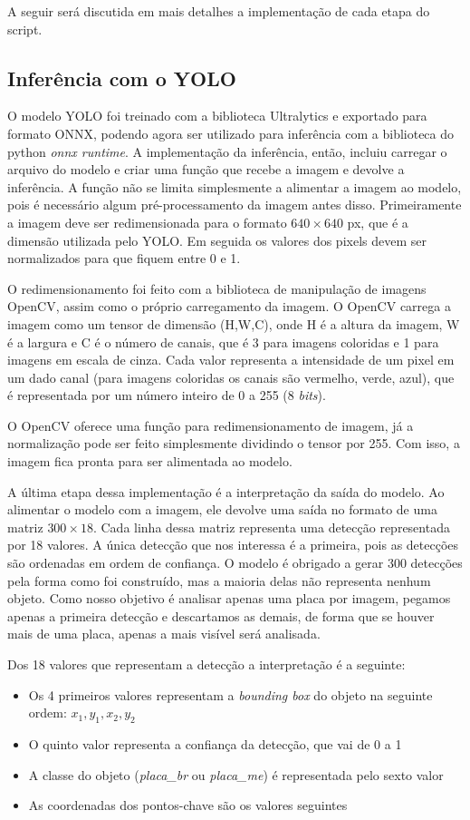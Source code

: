 A seguir será discutida em mais detalhes a implementação de cada etapa do script.

\subsection{Inferência com o YOLO}
O modelo YOLO foi treinado com a biblioteca Ultralytics e exportado para formato ONNX, podendo agora ser utilizado para inferência com a biblioteca do python \textit{onnx runtime}. A implementação da inferência, então, incluiu carregar o arquivo do modelo e criar uma função que recebe a imagem e devolve a inferência.
A função não se limita simplesmente a alimentar a imagem ao modelo, pois é necessário algum pré-processamento da imagem antes disso. Primeiramente a imagem deve ser redimensionada para o formato $640 \times 640$ px, que é a dimensão utilizada pelo YOLO. Em seguida os valores dos pixels devem ser normalizados para que fiquem entre 0 e 1.

O redimensionamento foi feito com a biblioteca de manipulação de imagens OpenCV, assim como o próprio carregamento da imagem. O OpenCV carrega a imagem como um tensor de dimensão (H,W,C), onde H é a altura da imagem, W é a largura e C é o número de canais, que é 3 para imagens coloridas e 1 para imagens em escala de cinza. Cada valor representa a intensidade de um pixel em um dado canal (para imagens coloridas os canais são vermelho, verde, azul), que é representada por um número inteiro de 0 a 255 (8 \textit{bits}).

O OpenCV oferece uma função para redimensionamento de imagem, já a normalização pode ser feito simplesmente dividindo o tensor por 255. Com isso, a imagem fica pronta para ser alimentada ao modelo.

A última etapa dessa implementação é a interpretação da saída do modelo. Ao alimentar o modelo com a imagem, ele devolve uma saída no formato de uma matriz $300 \times 18$. Cada linha dessa matriz representa uma detecção representada por 18 valores. A única detecção que nos interessa é a primeira, pois as detecções são ordenadas em ordem de confiança. O modelo é obrigado a gerar 300 detecções pela forma como foi construído, mas a maioria delas não representa nenhum objeto. Como nosso objetivo é analisar apenas uma placa por imagem, pegamos apenas a primeira detecção e descartamos as demais, de forma que se houver mais de uma placa, apenas a mais visível será analisada.

Dos 18 valores que representam a detecção a interpretação é a seguinte:
\begin{itemize} 
\item Os 4 primeiros valores representam a \textit{bounding box} do objeto na seguinte ordem: $x_1,y_1,x_2,y_2$ 
\item O quinto valor representa a confiança da detecção, que vai de 0 a 1 
\item A classe do objeto (\textit{placa\_br} ou \textit{placa\_me}) é representada pelo sexto valor 
\item As coordenadas dos pontos-chave são os valores seguintes 
\end{itemize}

